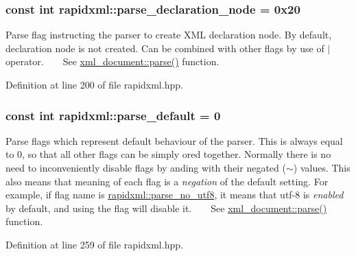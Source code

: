 \subsubsection[{\texorpdfstring{parse\+\_\+declaration\+\_\+node}{parse_declaration_node}}]{\setlength{\rightskip}{0pt plus 5cm}const int rapidxml\+::parse\+\_\+declaration\+\_\+node = 0x20}\hypertarget{namespacerapidxml_a999d782659513f8015ea4236e3204c42}{}\label{namespacerapidxml_a999d782659513f8015ea4236e3204c42}
Parse flag instructing the parser to create X\+ML declaration node. By default, declaration node is not created. Can be combined with other flags by use of $\vert$ operator. ~\newline
~\newline
 See \hyperlink{classrapidxml_1_1xml__document_ac6e73ff9ac323bf5a370c38feb03a6b1}{xml\+\_\+document\+::parse()} function. 

Definition at line 200 of file rapidxml.\+hpp.

\subsubsection[{\texorpdfstring{parse\+\_\+default}{parse_default}}]{\setlength{\rightskip}{0pt plus 5cm}const int rapidxml\+::parse\+\_\+default = 0}\hypertarget{namespacerapidxml_acf4edf952f59eb1b6124ea37ad7da3ab}{}\label{namespacerapidxml_acf4edf952f59eb1b6124ea37ad7da3ab}
Parse flags which represent default behaviour of the parser. This is always equal to 0, so that all other flags can be simply ored together. Normally there is no need to inconveniently disable flags by anding with their negated ($\sim$) values. This also means that meaning of each flag is a {\itshape negation} of the default setting. For example, if flag name is \hyperlink{namespacerapidxml_a22d4aefaceb00d7afabfef7107b108da}{rapidxml\+::parse\+\_\+no\+\_\+utf8}, it means that utf-\/8 is {\itshape enabled} by default, and using the flag will disable it. ~\newline
~\newline
 See \hyperlink{classrapidxml_1_1xml__document_ac6e73ff9ac323bf5a370c38feb03a6b1}{xml\+\_\+document\+::parse()} function. 

Definition at line 259 of file rapidxml.\+hpp.

